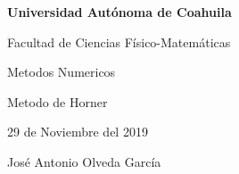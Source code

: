 \documentclass{article}
\begin{document}
\begin{center}
{\Large \textbf{Universidad Autónoma de Coahuila}}
\end{center}

\begin{center}
{\large Facultad de Ciencias Físico-Matemáticas}
\end{center}

\begin{center}
{\large Metodos Numericos}
\end{center}

\begin{center}
{\large Metodo de Horner}
\end{center}

\begin{center}
{\large 29 de Noviembre del 2019}
\end{center}

\begin{center}
{\large José Antonio Olveda García}
\end{center}

\vspace{5mm}
\end{document}
